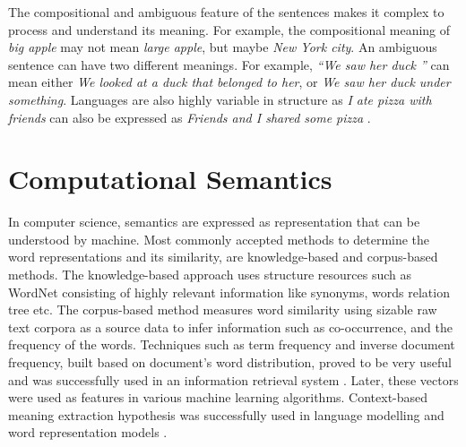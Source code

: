 \documentclass[12pt]{report} %
\begin{document}
	The compositional and ambiguous feature of the sentences makes it complex to process and understand its meaning. For example, the compositional meaning of \textit{big apple} may not mean \textit{large apple}, but maybe \textit{New York city}. An ambiguous sentence can have two different meanings. For example, \textit{\textquotedblleft We saw her duck \textquotedblright} can mean either \textit{We looked at a duck that belonged to her}, or \textit{We saw her duck under something}. Languages are also highly variable in structure as \textit{I ate pizza with friends} can also be expressed as \textit{Friends and I shared some pizza} \citep{jurafsky2014speech}. %
	
	
	
	
	
	
	\section{Computational Semantics}
	\label{com_sem}
	
	In computer science, semantics are expressed as representation that can be understood by machine. Most commonly accepted methods to determine the word representations and its similarity, are knowledge-based and corpus-based methods. The knowledge-based approach uses structure resources such as WordNet \citep{pedersen2004wordnet} consisting of highly relevant information like synonyms, words relation tree etc. The corpus-based method measures word similarity using sizable raw text corpora as a source data to infer information such as co-occurrence, and the frequency of the words.
	Techniques such as term frequency and inverse document frequency, built based on document's word distribution, proved to be very useful and was successfully used in an information retrieval system \citep{salton1971smart, deerwester1989computer}. 
	Later, these vectors were used as features in various machine learning algorithms. Context-based meaning extraction hypothesis was successfully used in language modelling \citep{bengio2003neural,collobert2008unified,collobert2011natural,mikolov2011extensions} and word representation models \citep{mikolov2014word2vec,pennington2014glove}. 
	
\end{document}

